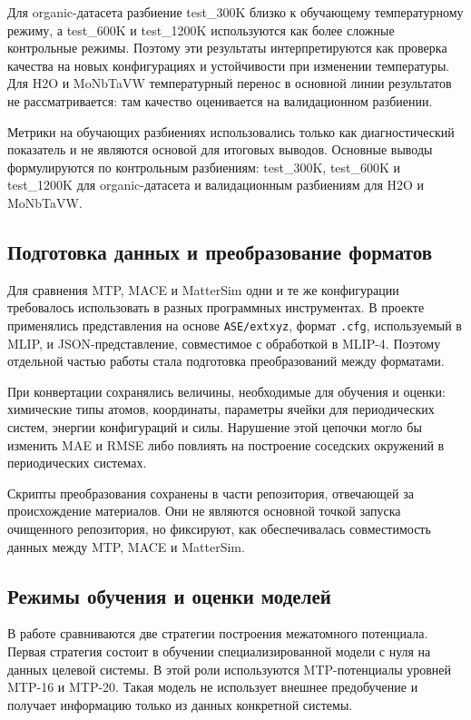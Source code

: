 Для organic-датасета разбиение test\_300K близко к обучающему температурному режиму, а test\_600K и test\_1200K используются как более сложные контрольные режимы. Поэтому эти результаты интерпретируются как проверка качества на новых конфигурациях и устойчивости при изменении температуры. Для H2O и MoNbTaVW температурный перенос в основной линии результатов не рассматривается: там качество оценивается на валидационном разбиении.

Метрики на обучающих разбиениях использовались только как диагностический показатель и не являются основой для итоговых выводов. Основные выводы формулируются по контрольным разбиениям: test\_300K, test\_600K и test\_1200K для organic-датасета и валидационным разбиениям для H2O и MoNbTaVW.

\subsection{Подготовка данных и преобразование форматов}

Для сравнения MTP, MACE и MatterSim одни и те же конфигурации требовалось использовать в разных программных инструментах. В проекте применялись представления на основе \texttt{ASE/extxyz}, формат \texttt{.cfg}, используемый в MLIP, и JSON-представление, совместимое с обработкой в MLIP-4. Поэтому отдельной частью работы стала подготовка преобразований между форматами.

При конвертации сохранялись величины, необходимые для обучения и оценки: химические типы атомов, координаты, параметры ячейки для периодических систем, энергии конфигураций и силы. Нарушение этой цепочки могло бы изменить MAE и RMSE либо повлиять на построение соседских окружений в периодических системах.

Скрипты преобразования сохранены в части репозитория, отвечающей за происхождение материалов. Они не являются основной точкой запуска очищенного репозитория, но фиксируют, как обеспечивалась совместимость данных между MTP, MACE и MatterSim.

\subsection{Режимы обучения и оценки моделей}

В работе сравниваются две стратегии построения межатомного потенциала. Первая стратегия состоит в обучении специализированной модели с нуля на данных целевой системы. В этой роли используются MTP-потенциалы уровней MTP-16 и MTP-20. Такая модель не использует внешнее предобучение и получает информацию только из данных конкретной системы.

